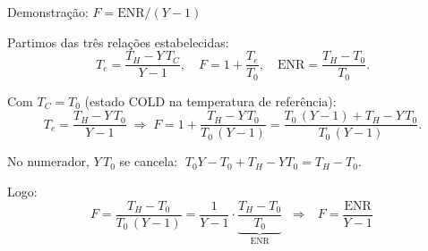 
\begin{frame}{Demonstração: $F = \mathrm{ENR}/(Y-1)$}

\footnotesize
Partimos das três relações estabelecidas:
\[
T_e = \frac{T_H - Y\,T_C}{Y-1}, \quad F = 1 + \frac{T_e}{T_0}, \quad \mathrm{ENR} = \frac{T_H - T_0}{T_0}.
\]

Com $T_C = T_0$ (estado COLD na temperatura de referência):
\[
T_e = \frac{T_H - Y\,T_0}{Y-1}
\;\Longrightarrow\;
F = 1 + \frac{T_H - Y\,T_0}{T_0\,(Y-1)} = \frac{T_0\,(Y-1) + T_H - Y\,T_0}{T_0\,(Y-1)}.
\]

No numerador, $Y\,T_0$ se cancela: $\;T_0 Y - T_0 + T_H - Y T_0 = T_H - T_0$.

Logo:
\[
F = \frac{T_H - T_0}{T_0\,(Y-1)} = \frac{1}{Y-1}\cdot\underbrace{\frac{T_H - T_0}{T_0}}_{\mathrm{ENR}} \;\;\Longrightarrow\;\; \boxed{\,F = \frac{\mathrm{ENR}}{Y-1}\,}
\]

\end{frame}


